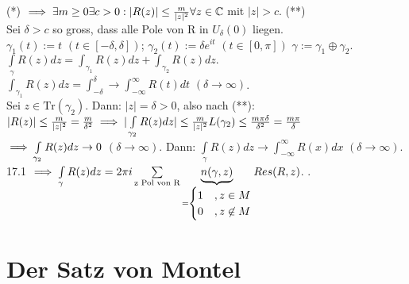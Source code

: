 \documentclass[a4paper,twoside,DIV15,BCOR12mm]{scrbook}
\def\Tr{\text{Tr}}
\def\wegint{\ensuremath{\int\limits_\gamma}}
\def\iint{\ensuremath{\int\limits}}
\begin{document}
\begin{beweis}
  (*) $\implies \exists m \ge 0 \exists c>0: |R(z)| \le \frac{m}{|z|^2} \forall z\in\mathbb{C}$ mit $|z|>c$. (**)\\
  Sei $\delta > c$ so gross, dass alle Pole von R in $U_\delta(0)$ liegen.\\
  $\gamma_1(t) := t$ $(t\in[-\delta,\delta])$; $\gamma_2(t):=\delta e^{it}$ $(t\in[0,\pi])$ $\gamma := \gamma_1 \oplus \gamma_2$.\\
  $\wegint R(z)dz = \iint_{\gamma_1}R(z)dz+\iint_{\gamma_2}R(z)dz.$ \\
  $\iint_{\gamma_1}R(z)dz = \iint_{-\delta}^\delta \to \iint_{-\infty}^\infty R(t)dt$ $(\delta\to\infty)$.\\
  Sei $z\in\Tr(\gamma_2)$. Dann: $|z| = \delta>0$, also nach (**): $|R(z)| \le \frac{m}{|z|^2} = \frac{m}{\delta^2} \folgt |\iint_{\gamma_2}R(z)dz| \le \frac{m}{|z|^2}L(\gamma_2)\le\frac{m\pi\delta}{\delta^2}=\frac{m\pi}{\delta}$\\
  $\folgt \iint_{\gamma_2}R(z)dz \to 0$ $(\delta\to\infty)$. Dann: $\wegint R(z)dz \to \iint_{-\infty}^\infty R(x) dx$ $(\delta \to \infty)$. 17.1 $\folgt \wegint R(z)dz = 2\pi i 
  \sum\limits_{\text{z Pol von R}} \underbrace{n(\gamma, z)}_{
      =
       \begin{cases} 
       1 & , z \in M \\ 
       0 & ,z \not\in M
       \end{cases}
  }  Res(R,z)$.
.				
\end{beweis}


\chapter{Der Satz von Montel} 
\end{document}
